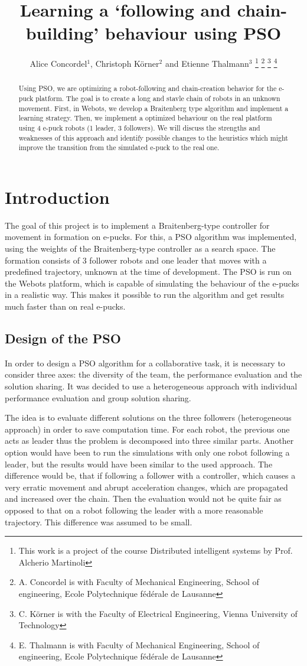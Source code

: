\documentclass[a4paper, 10pt, conference]{ieeeconf}      %
\title{\LARGE \bf
Learning a `following and chain-building' behaviour using PSO
}
\author{Alice Concordel$^{1}$, Christoph K\"{o}rner$^{2}$ and Etienne Thalmann$^{3}$%
\thanks{This work is a project of the course Distributed intelligent systems by Prof. Alcherio Martinoli}%
\thanks{A. Concordel is with Faculty of Mechanical Engineering, School of engineering, Ecole Polytechnique fédérale de Lausanne}
\thanks{C. K\"{o}rner is with the Faculty of Electrical Engineering, Vienna University of Technology} %
\thanks{E. Thalmann is with Faculty of Mechanical Engineering, School of engineering, Ecole Polytechnique fédérale de Lausanne}%
}
\begin{document}
\maketitle
\thispagestyle{empty}
\pagestyle{empty}


\begin{abstract}
Using PSO, we are optimizing a robot-following and chain-creation behavior for the e-puck platform. The goal is to create a long and stavle chain of robots in an unknown movement. First, in Webots, we develop a Braitenberg type algorithm and implement a learning strategy. Then, we implement a optimized behaviour on the real platform using 4 e-puck robots (1 leader, 3 followers). We will discuss the strengths and weaknesses of this approach and identify possible changes to the heuristics which might improve the transition from the simulated e-puck to the real one.
\end{abstract}


\section{Introduction}
The goal of this project is to implement a Braitenberg-type controller for movement in formation on e-pucks. For this, a PSO algorithm was implemented, using the weights of the Braitenberg-type controller as a search space. The formation consists of 3 follower robots and one leader that moves with a predefined trajectory, unknown at the time of development. The PSO is run on the Webots platform, which is capable of simulating the behaviour of the e-pucks in a realistic way. This makes it possible to run the algorithm and get results much faster than on real e-pucks.

\subsection{Design of the PSO}
In order to design a PSO algorithm for a collaborative task, it is necessary to consider three axes: the diversity of the team, the performance evaluation and the solution sharing. It was decided  to use a heterogeneous approach with individual performance evaluation and group solution sharing. 

The idea is to evaluate different solutions on the three followers (heterogeneous approach) in order to save computation time. For each robot, the previous one acts as leader thus the problem is decomposed into three similar parts. Another option would have been to run the simulations with only one robot following a leader, but the results would have been similar to the used approach. The difference would be, that if following a follower with a controller, which causes a very erratic movement and abrupt acceleration changes, which are propagated and increased over the chain. Then the evaluation would not be quite fair as opposed to that on a robot following the leader with a more reasonable trajectory. This difference was assumed to be small.
\end{document}
